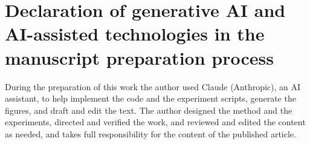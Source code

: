 \documentclass[preprint,12pt,authoryear]{elsarticle}
\begin{document}
\section*{Declaration of generative AI and AI-assisted technologies in the manuscript preparation process}
During the preparation of this work the author used Claude (Anthropic), an AI assistant, to help implement the
code and the experiment scripts, generate the figures, and draft and edit the text. The author designed the
method and the experiments, directed and verified the work, and reviewed and edited the content as needed, and
takes full responsibility for the content of the published article.



\end{document}
